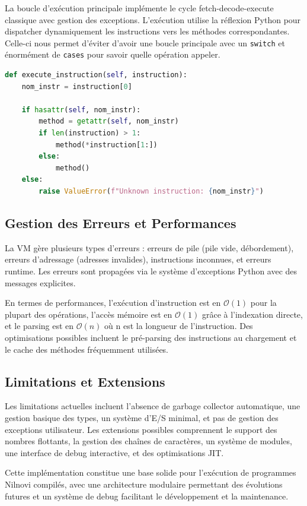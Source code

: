 \documentclass[a4paper, 12pt]{article}
\begin{document}
    La boucle d'exécution principale implémente le cycle fetch-decode-execute classique avec gestion des exceptions. L'exécution utilise la réflexion Python pour dispatcher dynamiquement les instructions vers les méthodes correspondantes. Celle-ci nous permet d'éviter d'avoir une boucle principale avec un \texttt{switch} et énormément de \texttt{cases} pour savoir quelle opération appeler.

    \begin{lstlisting}[caption=Dispatch dynamique des instructions,language=python, xleftmargin=20pt]
def execute_instruction(self, instruction):
    nom_instr = instruction[0]
    
    if hasattr(self, nom_instr):
        method = getattr(self, nom_instr)
        if len(instruction) > 1:
            method(*instruction[1:])
        else:
            method()
    else:
        raise ValueError(f"Unknown instruction: {nom_instr}") \end{lstlisting}

    \subsection{Gestion des Erreurs et Performances}

    La VM gère plusieurs types d'erreurs : erreurs de pile (pile vide, débordement), erreurs d'adressage (adresses invalides), instructions inconnues, et erreurs runtime. Les erreurs sont propagées via le système d'exceptions Python avec des messages explicites.

    En termes de performances, l'exécution d'instruction est en $\mathcal O(1)$ pour la plupart des opérations, l'accès mémoire est en $\mathcal O(1)$ grâce à l'indexation directe, et le parsing est en $\mathcal O(n)$ où n est la longueur de l'instruction. Des optimisations possibles incluent le pré-parsing des instructions au chargement et le cache des méthodes fréquemment utilisées.

    \subsection{Limitations et Extensions}

    Les limitations actuelles incluent l'absence de garbage collector automatique, une gestion basique des types, un système d'E/S minimal, et pas de gestion des exceptions utilisateur. Les extensions possibles comprennent le support des nombres flottants, la gestion des chaînes de caractères, un système de modules, une interface de debug interactive, et des optimisations JIT.

    Cette implémentation constitue une base solide pour l'exécution de programmes Nilnovi compilés, avec une architecture modulaire permettant des évolutions futures et un système de debug facilitant le développement et la maintenance.
\end{document}
